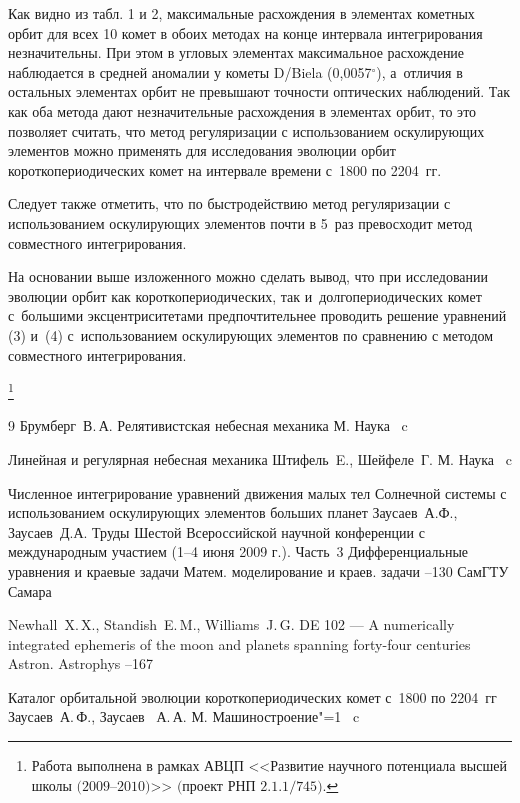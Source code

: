 Как видно из табл. 1 и 2, максимальные расхождения в элементах кометных орбит  для всех 10 комет в обоих методах на конце интервала интегрирования незначительны.
При этом в угловых элементах максимальное расхождение наблюдается в средней аномалии у кометы D/Biela (0,0057$^\circ$), а~отличия в остальных элементах орбит не превышают точности оптических наблюдений.
Так как оба метода дают незначительные расхождения в элементах орбит, то это позволяет считать, что метод регуляризации с использованием оскулирующих элементов можно применять для исследования эволюции орбит короткопериодических комет на интервале времени с~1800 по 2204~гг.

Следует также отметить, что по быстродействию метод регуляризации с использованием оскулирующих элементов почти в 5~раз превосходит метод совместного интегрирования.

На основании выше изложенного можно сделать вывод, что при исследовании эволюции орбит как короткопериодических, так и~долгопериодических комет с~большими эксцентриситетами предпочтительнее  проводить решение уравнений (3) и~(4) с~использованием оскулирующих элементов по сравнению с методом совместного интегрирования.


\thanks{Работа выполнена в рамках АВЦП <<Развитие научного потенциала высшей школы $(2009$--$2010)$>>  $($проект РНП $2.1.1/745)$.}




\begin{thebibliography}{9}
\by Брумберг~В.\,А.
\book Релятивистская небесная механика
\publaddr М.
\publ Наука
~c

\book Линейная и регулярная небесная механика
\by Штифель~E., Шейфеле~Г.
\publaddr М.
\publ Наука
~c

\paper Численное интегрирование уравнений движения малых тел Солнечной системы с использованием оскулирующих элементов больших планет
\by Заусаев~А.Ф., Заусаев~Д.А.
\inbook Труды Шестой Всероссийской научной конференции с международным участием {\rm\mbox{(1--4}} июня {\rm2009} г.{\rm). Часть~3}
\bookinfo Дифференциальные уравнения и краевые задачи
\serial Матем. моделирование и краев. задачи
--130
\publ СамГТУ
\publaddr Самара

\by Newhall~X.\,X., Standish~E.\,M., Williams~J.\,G.
\paper DE 102 --- A numerically integrated ephemeris of the moon and planets spanning forty-four centuries
\jour Astron. Astrophys
--167

\book Каталог орбитальной эволюции короткопериодических комет с~1800 по 2204~гг
\by Заусаев~А.\,Ф., Заусаев~ А.\,А.
\publaddr М.
\publ Машиностроение"=1
~c

\end{thebibliography}

\vspace{-5mm}



\makeengtitle

%
%
% 
